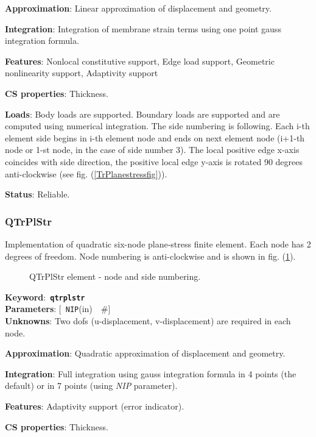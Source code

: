 \documentclass[a4paper]{article}
\newcommand{\descitem}[1]{{\noindent \bf #1}:}
\newcommand{\elemkeyword}[1]{\descitem{Keyword}~{\bf \texttt{#1}}}
\newcommand{\elemparam}[2]{{{\texttt{#1}\tiny (#2)}~~\#}}
\newcommand{\optelemparam}[2]{{[~\elemparam{#1}{#2}]}}
\newcommand{\param}[1]{{\em #1}}
\begin{document}
\descitem{Approximation} Linear approximation of displacement and
geometry.

\descitem{Integration}
Integration of membrane strain terms using one point gauss integration formula.

\descitem{Features} Nonlocal constitutive support, Edge load
support, Geometric nonlinearity support, Adaptivity support

\descitem{CS properties} Thickness. 

\descitem{Loads} Body loads are supported. Boundary loads are
supported and are computed  using numerical integration. The side numbering is
following. Each i-th element side begins in i-th element node and
ends on next element node (i+1-th node or 1-st node, in the case of 
side number 3). The local positive edge x-axis coincides with side
direction, the positive local edge y-axis is rotated 90 degrees
anti-clockwise (see fig. (\ref{TrPlanestressfig})).

\descitem{Status} Reliable.

\subsubsection{QTrPlStr}
Implementation of quadratic six-node plane-stress finite
element. Each node has 2 degrees of freedom. Node numbering is
anti-clockwise and is shown in fig. (\ref{qtrplanstressfig}).

\begin{figure}[htb]
 \centering
 \begin{makeimage}
  
 \end{makeimage}
 \caption{QTrPlStr element - node and side numbering.}
 \label{qtrplanstressfig}
\end{figure}

\elemkeyword{qtrplstr}\\
\descitem{Parameters} \optelemparam{NIP}{in}\\
\descitem{Unknowns}
Two dofs (u-displacement, v-displacement) are required in each node.

\descitem{Approximation} Quadratic approximation of displacement and
geometry.

\descitem{Integration}
Full integration using gauss integration formula in 4 points (the
default) or in 7 points (using \param{NIP} parameter).

\descitem{Features} Adaptivity support (error indicator).

\descitem{CS properties} Thickness. 
\end{document}
